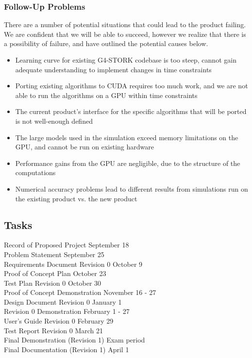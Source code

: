 \documentclass[12pt]{article}
\begin{document}
\subsubsection{Follow-Up Problems}
There are a number of potential situations that could lead to the product failing. We are confident that we will be able to succeed, however we realize that there is a possibility of failure, and have outlined the potential causes below.
\begin{itemize}
\item Learning curve for existing G4-STORK codebase is too steep, cannot gain adequate understanding to implement changes in time constraints
\item Porting existing algorithms to CUDA requires too much work, and we are not able to run the algorithms on a GPU within time constraints
\item The current product's interface for the specific algorithms that will be ported is not well-enough defined
\item The large models used in the simulation exceed memory limitations on the GPU, and cannot be run on existing hardware
\item Performance gains from the GPU are negligible, due to the structure of the computations
\item Numerical accuracy problems lead to different results from simulations run on the existing product vs. the new product
\end{itemize}

\subsection{Tasks}\label{SubSec_Tasks} %
Record of Proposed Project \hfill September 18\\
Problem Statement \hfill September 25\\
Requirements Document Revision 0 \hfill October 9\\
Proof of Concept Plan \hfill October 23\\
Test Plan Revision 0 \hfill October 30\\
Proof of Concept Demonstration \hfill November 16 - 27\\
Design Document Revision 0 \hfill January 1\\
Revision 0 Demonstration \hfill February 1 - 27\\
User's Guide Revision 0 \hfill February 29\\
Test Report Revision 0 \hfill March 21\\
Final Demonstration (Revision 1) \hfill Exam period\\
Final Documentation (Revision 1) \hfill April 1
\end{document}
